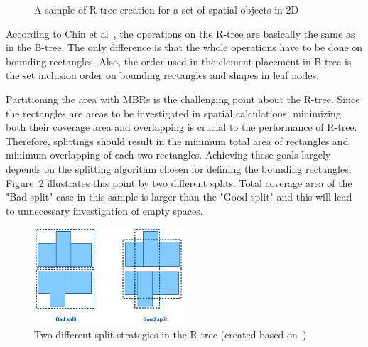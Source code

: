 \documentclass[a4paper,12pt]{article}
\begin{document}
\begin{figure}
\centering
{}
\centering
{}
\caption{A sample of R-tree creation for a set of spatial objects in 2D}
\label{rtree}
\end{figure}

According to Chin et al~\cite{survey}, the operations on the R-tree 
are basically the same as in the B-tree. The only difference is that the 
whole operations have to be done on bounding rectangles.
Also, the order used in the element placement in B-tree
is the set inclusion order on bounding rectangles and shapes in leaf nodes. 

Partitioning the area with MBRs is the challenging point about the R-tree. 
Since the rectangles are areas to be investigated in spatial calculations, minimizing both their coverage area and overlapping is crucial to the performance of R-tree. Therefore, splittings should result in the minimum total area of rectangles and minimum overlapping of each two rectangles. 
Achieving these goals largely depends on the splitting algorithm chosen for defining the bounding rectangles. Figure~\ref{rtreesplit} illustrates this point by two different splits. Total coverage area of the "Bad split" case in this sample is larger than the "Good split" and this will lead to unnecessary investigation of empty spaces.

\begin{figure}
\centering
\includegraphics[width=0.5\textwidth,height=0.17\textheight]{R-treeMBR}
\caption{Two different split strategies in the R-tree (created based on~\cite{rtree})}
\label{rtreesplit}
\end{figure}
\end{document}
